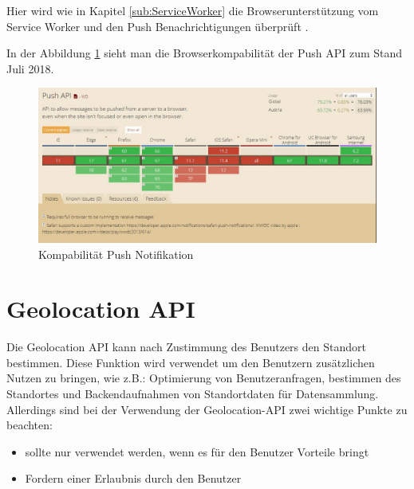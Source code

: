 Hier wird wie in Kapitel \ref{sub:ServiceWorker} die Browserunterstützung vom Service Worker und den Push Benachrichtigungen überprüft \cite{PushNotifikation}.
\newpage

In der Abbildung \ref{fig:BrowserPushAPI} sieht man die Browserkompabilität der Push API zum Stand Juli 2018.
\begin{figure}[h]
	\centering
	\includegraphics[width=14cm]{BilderAllgemein/BrowserPushAPI}\medskip
	\caption{Kompabilität Push Notifikation \cite{BrowserSupport}}
	\label{fig:BrowserPushAPI}
\end{figure}




\newpage
\section{Geolocation API}
Die Geolocation API kann nach Zustimmung des Benutzers den Standort bestimmen. Diese Funktion wird verwendet  um den Benutzern zusätzlichen Nutzen zu bringen, wie z.B.: Optimierung von Benutzeranfragen, bestimmen des Standortes und Backendaufnahmen von Standortdaten für Datensammlung. 
Allerdings sind bei der Verwendung der Geolocation-API zwei wichtige Punkte zu beachten:

\begin{itemize}
    \item  sollte nur verwendet werden, wenn es für den Benutzer Vorteile bringt 
	\item  Fordern einer Erlaubnis durch den Benutzer  
\end{itemize}




